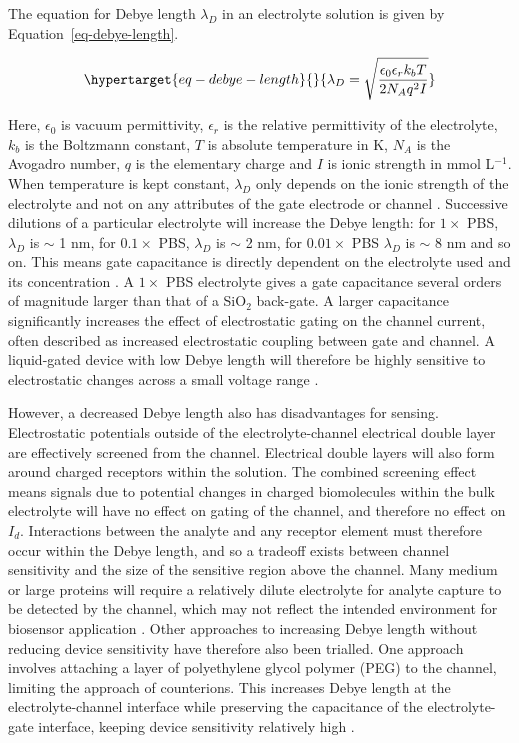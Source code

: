 \documentclass[
  a4paper,
]{scrbook}
\begin{document}
The equation for Debye length \(\lambda_D\) in an electrolyte solution
is given by Equation~\ref{eq-debye-length}.

\begin{equation}\protect\hypertarget{eq-debye-length}{}{
\lambda_D = \sqrt{\frac{\epsilon_0\epsilon_rk_bT}{2N_Aq^2I}}
}\label{eq-debye-length}\end{equation}

Here, \(\epsilon_0\) is vacuum permittivity, \(\epsilon_r\) is the
relative permittivity of the electrolyte, \(k_b\) is the Boltzmann
constant, \(T\) is absolute temperature in K, \(N_A\) is the Avogadro
number, \(q\) is the elementary charge and \(I\) is ionic strength in
mmol L\(^{-1}\). When temperature is kept constant, \(\lambda_D\) only
depends on the ionic strength of the electrolyte and not on any
attributes of the gate electrode or channel
\autocite{Stern2007,Shkodra2021}. Successive dilutions of a particular
electrolyte will increase the Debye length: for \(1 \times\) PBS,
\(\lambda_D\) is \(\sim\) 1 nm, for \(0.1 \times\) PBS, \(\lambda_D\) is
\(\sim\) 2 nm, for \(0.01 \times\) PBS \(\lambda_D\) is \(\sim\) 8 nm
and so on. This means gate capacitance is directly dependent on the
electrolyte used and its concentration
\autocite{Kireev2017,Shkodra2021}. A \(1 \times\) PBS electrolyte gives
a gate capacitance several orders of magnitude larger than that of a
SiO\(_2\) back-gate. A larger capacitance significantly increases the
effect of electrostatic gating on the channel current, often described
as increased electrostatic coupling between gate and channel. A
liquid-gated device with low Debye length will therefore be highly
sensitive to electrostatic changes across a small voltage range
\autocite{Heller2010,Ohno2015,Kireev2017,Yao2021}.

However, a decreased Debye length also has disadvantages for sensing.
Electrostatic potentials outside of the electrolyte-channel electrical
double layer are effectively screened from the channel. Electrical
double layers will also form around charged receptors within the
solution. The combined screening effect means signals due to potential
changes in charged biomolecules within the bulk electrolyte will have no
effect on gating of the channel, and therefore no effect on \(I_d\).
Interactions between the analyte and any receptor element must therefore
occur within the Debye length, and so a tradeoff exists between channel
sensitivity and the size of the sensitive region above the channel. Many
medium or large proteins will require a relatively dilute electrolyte
for analyte capture to be detected by the channel, which may not reflect
the intended environment for biosensor application
\autocite{Stern2007,Piccinini2018,Shkodra2021}. Other approaches to
increasing Debye length without reducing device sensitivity have
therefore also been trialled. One approach involves attaching a layer of
polyethylene glycol polymer (PEG) to the channel, limiting the approach
of counterions. This increases Debye length at the electrolyte-channel
interface while preserving the capacitance of the electrolyte-gate
interface, keeping device sensitivity relatively high
\autocite{Gao2016,Filipiak2018,Kesler2020,Albarghouthi2022}.
\end{document}
